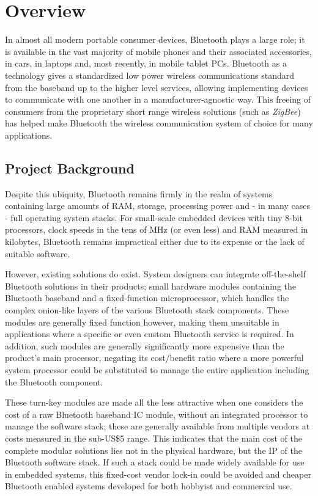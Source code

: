 \chapter{Overview}
\label{Chapter1}

In almost all modern portable consumer devices, Bluetooth plays a large role; it is available in the vast majority of mobile phones and their associated accessories, in cars, in laptops and, most recently, in mobile tablet PCs. Bluetooth as a technology gives a standardized low power wireless communications standard from the baseband up to the higher level services, allowing implementing devices to communicate with one another in a manufacturer-agnostic way. This freeing of consumers from the proprietary short range wireless solutions (such as \textit{ZigBee}) has helped make Bluetooth the wireless communication system of choice for many applications.

\section{Project Background}

Despite this ubiquity, Bluetooth remains firmly in the realm of systems containing large amounts of RAM, storage, processing power and - in many cases - full operating system stacks. For small-scale embedded devices with tiny 8-bit processors, clock speeds in the tens of MHz (or even less) and RAM measured in kilobytes, Bluetooth remains impractical either due to its expense or the lack of suitable software.

However, existing solutions do exist. System designers can integrate off-the-shelf Bluetooth solutions in their products; small hardware modules containing the Bluetooth baseband and a fixed-function microprocessor, which handles the complex onion-like layers of the various Bluetooth stack components. These modules are generally fixed function however, making them unsuitable in applications where a specific or even custom Bluetooth service is required. In addition, such modules are generally significantly more expensive than the product's main processor, negating its cost/benefit ratio where a more powerful system processor could be substituted to manage the entire application including the Bluetooth component.

These turn-key modules are made all the less attractive when one considers the cost of a raw Bluetooth baseband IC module, without an integrated processor to manage the software stack; these are generally available from multiple vendors at costs measured in the sub-US\$5 range. This indicates that the main cost of the complete modular solutions lies not in the physical hardware, but the IP of the Bluetooth software stack. If such a stack could be made widely available for use in embedded systems, this fixed-cost vendor lock-in could be avoided and cheaper Bluetooth enabled systems developed for both hobbyist and commercial use.

